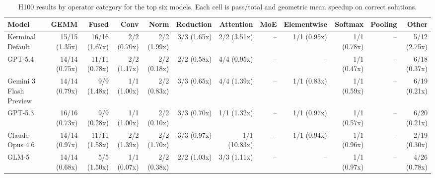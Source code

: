 \begin{table}[t]
\centering
\small
\caption{H100 results by operator category for the top six models. Each cell is pass/total and geometric mean speedup on correct solutions.}
\label{tab:h100-category}
\begin{tabular}{lrrrrrrrrrrr}
\toprule
Model & GEMM & Fused & Conv & Norm & Reduction & Attention & MoE & Elementwise & Softmax & Pooling & Other \\
\midrule
Kerminal Default & 15/15 (1.35x) & 16/16 (1.67x) & 2/2 (0.70x) & 2/2 (1.99x) & 3/3 (1.65x) & 2/2 (3.51x) & -- & 1/1 (0.95x) & 1/1 (0.78x) & -- & 5/12 (2.75x) \\
GPT-5.4 & 14/14 (0.75x) & 11/11 (0.78x) & 2/2 (1.17x) & 2/2 (0.18x) & 2/2 (0.58x) & 4/4 (0.95x) & -- & -- & 1/1 (0.47x) & -- & 6/18 (0.37x) \\
Gemini 3 Flash Preview & 14/14 (0.79x) & 9/9 (1.48x) & 1/1 (1.00x) & 2/2 (0.83x) & 3/3 (0.65x) & 4/4 (1.39x) & -- & 1/1 (0.83x) & 1/1 (0.59x) & -- & 6/19 (0.21x) \\
GPT-5.3 & 16/16 (0.73x) & 9/9 (0.28x) & 1/1 (1.00x) & 2/2 (0.10x) & 3/3 (0.70x) & 1/1 (1.32x) & -- & 1/1 (0.97x) & 1/1 (0.57x) & -- & 6/20 (0.21x) \\
Claude Opus 4.6 & 14/14 (0.97x) & 11/11 (1.58x) & 2/2 (1.39x) & 2/2 (1.70x) & 3/3 (0.97x) & 1/1 (10.83x) & -- & 1/1 (0.94x) & 1/1 (0.96x) & -- & 2/19 (0.30x) \\
GLM-5 & 14/14 (0.68x) & 5/5 (1.50x) & 1/1 (0.07x) & 2/2 (0.38x) & 2/2 (1.03x) & 3/3 (1.11x) & -- & -- & 1/1 (0.97x) & -- & 4/26 (0.78x) \\
\bottomrule
\end{tabular}
\end{table}
